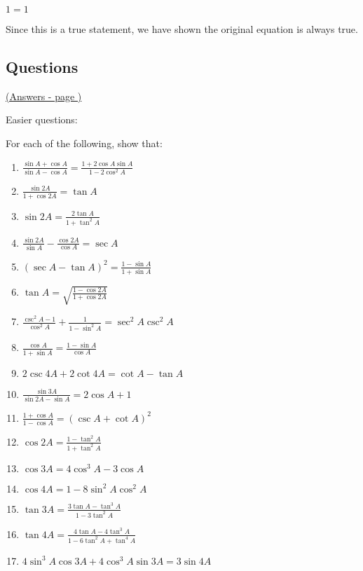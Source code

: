 \documentclass[../main.tex]{subfiles}
\begin{document}
$1=1$

Since this is a true statement, we have shown the original equation is always true.

\pagebreak
\hypertarget{trigidentitieslink}{\subsection*{Questions}}
\hyperlink{trigidentitiesanswers}{(Answers - page {\pageref*{Trig identities answers}})}

\label{Trig identities}

Easier questions:

For each of the following, show that:
\begin{enumerate}
    \item $\frac{\sin{A}+\cos{A}}{\sin{A}-\cos{A}}=\frac{1+2\cos{A}\sin{A}}{1-2\cos^2{A}}$
    
    \item $\frac{\sin{2A}}{1+\cos{2A}}=\tan{A}$
    
    \item $\sin{2A}=\frac{2\tan{A}}{1+\tan^2{A}}$
    
    \item $\frac{\sin{2A}}{\sin{A}}-\frac{\cos{2A}}{\cos{A}}=\sec{A}$
    
    \item $(\sec{A}-\tan{A})^2=\frac{1-\sin{A}}{1+\sin{A}}$
    
    \item $\tan{A}=\sqrt{\frac{1-\cos{2A}}{1+\cos{2A}}}$

    \item $\frac{\csc^2{A}-1}{\cos^2{A}}+\frac{1}{1-\sin^2{A}}=\sec^2{A}\csc^2{A}$
    
    \item $\frac{\cos{A}}{1+\sin{A}}=\frac{1-\sin{A}}{\cos{A}}$
    
    \item $2\csc{4A}+2\cot{4A}=\cot{A}-\tan{A}$
    
    \item $\frac{\sin{3A}}{\sin{2A}-\sin{A}}=2\cos{A}+1$
    
    \item $\frac{1+\cos{A}}{1-\cos{A}}=(\csc{A}+\cot{A})^2$
    
    \item $\cos{2A}=\frac{1-\tan^2{A}}{1+\tan^2{A}}$
    
    \item $\cos{3A}=4\cos^3{A}-3\cos{A}$
    
    \item $\cos{4A}=1-8\sin^2{A}\cos^2{A}$
    
    \item $\tan{3A}=\frac{3\tan{A}-\tan^3{A}}{1-3\tan^2{A}}$
    
    \item $\tan{4A}=\frac{4\tan{A}-4\tan^3{A}}{1-6\tan^2{A}+\tan^4{A}}$
    
    \item $4\sin^3{A}\cos{3A}+4\cos^3{A}\sin{3A}=3\sin{4A}$


\end{enumerate}
\end{document}
